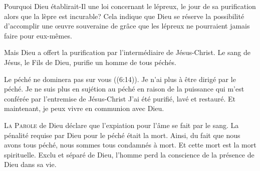 Pourquoi Dieu établirait-Il une loi concernant le lépreux,
 le jour de sa purification alors que la lèpre est incurable?
 Cela indique que Dieu se réserve la possibilité d'accomplir
 une \oe{}uvre souveraine de grâce que les lépreux ne pourraient
 jamais faire pour eux-mêmes. 


Mais Dieu a offert la purification par l'intermédiaire de Jésus-Christ.
 Le sang de Jésus, le Fils de Dieu, purifie un homme de tous péchés. 

\Og Le péché ne dominera pas sur vous \Fg{} ((6:14)).
 Je n'ai plus à être dirigé par le péché.
 Je ne suis plus en sujétion 
 au péché en raison de la puissance
 qui m'est conférée par l'entremise de Jésus-Christ
 \ocadr{}J'ai été purifié, lavé et restauré.
 Et maintenant, je peux vivre en communion avec Dieu. 

\dvrule







\lettrine{L}{a Parole} de Dieu déclare que l'expiation
 pour l'âme se fait par le sang.
 La pénalité requise par Dieu pour le péché était la mort.
 Ainsi, du fait que nous avons tous péché,
 nous sommes tous condamnés à mort.
 Et cette mort est la mort spirituelle. Exclu et séparé de Dieu,
 l'homme perd la conscience de la présence de Dieu dans sa vie. 

